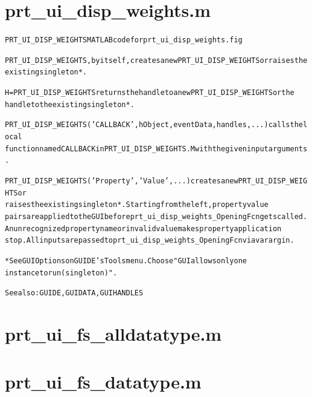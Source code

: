 \section{prt\_ui\_disp\_weights.m}
\begin{alltt}

 PRT\_UI\_DISP\_WEIGHTS MATLAB code for prt\_ui\_disp\_weights.fig
 
 PRT\_UI\_DISP\_WEIGHTS, by itself, creates a new PRT\_UI\_DISP\_WEIGHTS or raises the
 existing singleton*.
 
 H = PRT\_UI\_DISP\_WEIGHTS returns the handle to a new PRT\_UI\_DISP\_WEIGHTS or the
 handle to the existing singleton*.
 
 PRT\_UI\_DISP\_WEIGHTS('CALLBACK',hObject,eventData,handles,...) calls the local
 function named CALLBACK in PRT\_UI\_DISP\_WEIGHTS.M with the given input arguments.
 
 PRT\_UI\_DISP\_WEIGHTS('Property','Value',...) creates a new PRT\_UI\_DISP\_WEIGHTS or
 raises the existing singleton*.  Starting from the left, property value
 pairs are applied to the GUI before prt\_ui\_disp\_weights\_OpeningFcn gets called.
 An unrecognized property name or invalid value makes property application
 stop.  All inputs are passed to prt\_ui\_disp\_weights\_OpeningFcn via varargin.
 
 *See GUI Options on GUIDE's Tools menu.  Choose "GUI allows only one
 instance to run (singleton)".
 
 See also: GUIDE, GUIDATA, GUIHANDLES
\end{alltt}


\section{prt\_ui\_fs\_alldatatype.m}
\begin{alltt}

\end{alltt}


\section{prt\_ui\_fs\_datatype.m}
\begin{alltt}

\end{alltt}


